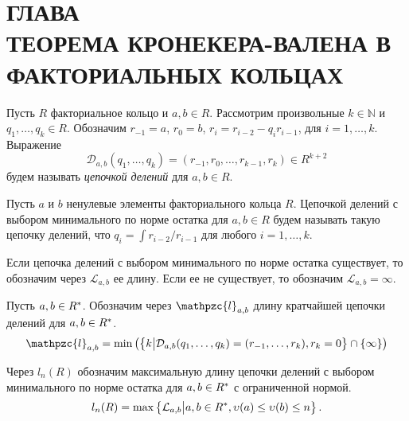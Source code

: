 \documentclass[_00_dissertation.tex]{subfiles}
\begin{document}
\onlyinsubfile{
    \renewcommand{\contentsname}{ОГЛАВЛЕНИЕ}
    \setcounter{tocdepth}{3}
    \tableofcontents
}

\chapter*{\MakeUppercase{Глава \\ Теорема Кронекера-Валена в факториальных кольцах}}\label{chapter:Kronecker-Vahlen theorem}

\begin{definition}
    Пусть $R$ факториальное кольцо и $a, b \in R$.
    Рассмотрим произвольные $k \in \mathbb{N}$ и $q_1, \dots, q_k \in R$.
    Обозначим $r_{-1} = a$, $r_0 = b$, $r_i = r_{i-2} - q_i r_{i-1}$, для $i = 1, \dots, k$.
    Выражение
    \begin{equation*}
        \mathcal{D}_{a, b}(q_1, \dots, q_k) = (r_{-1}, r_0, \dots, r_{k-1}, r_k) \in R^{k+2}
    \end{equation*}
    будем называть \emph{цепочкой делений} для $a, b \in R$.
\end{definition}

\begin{definition}
    Пусть $a$ и $b$ ненулевые элементы факториального кольца $R$.
    Цепочкой делений с выбором минимального по норме остатка для $a, b \in R$ будем называть такую цепочку делений, что $q_i = \int{r_{i-2}/r_{i-1}}$ для любого $i = 1, \dots, k$.

    Если цепочка делений с выбором минимального по норме остатка существует, то обозначим через $\mathcal{L}_{a, b}$ ее длину.
    Если ее не существует, то обозначим $\mathcal{L}_{a, b} = \infty$.
\end{definition}

\begin{definition}
    Пусть $a, b \in R^{*}$.
    Обозначим через $\mathpzc{l}_{a, b}$ длину кратчайшей цепочки делений для $a, b \in R^{*}$.
    \begin{equation*}
        \mathpzc{l}_{a, b} = \min\left(
            \left\{
                k \big| \mathcal{D}_{a, b}(q_1, \dots, q_k) = (r_{-1}, \dots, r_k), r_k = 0
            \right\} \cap \{\infty\}
        \right)
    \end{equation*}
\end{definition}

\begin{definition}
    Через $l_n(R)$ обозначим максимальную длину цепочки делений с выбором минимального по норме остатка для $a, b \in R^{*}$ с ограниченной нормой.
    \begin{equation*}
        l_n(R) = \max \left\{
            \mathcal{L}_{a, b} \big| a, b \in R^{*}, \upsilon(a) \le \upsilon(b) \le n
        \right\}.
    \end{equation*}
\end{definition}
\end{document}
